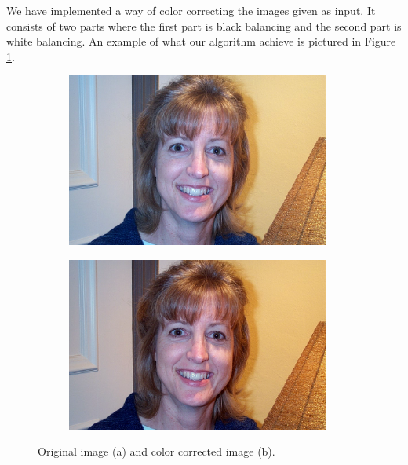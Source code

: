 We have implemented a way of color correcting the images given as input. It consists of two parts where the first part is black balancing and the second part is white balancing. An example of what our algorithm achieve is pictured in Figure \ref{fig:cc}.  

\begin{figure}[H]
\centering

\begin{subfigure}{.33\textwidth}
  \centering
  \includegraphics[width=0.95\textwidth]{img/cc/orig.jpg}
  \caption{}
\end{subfigure}%
\begin{subfigure}{.33\textwidth}
  \centering
  \includegraphics[width=0.95\textwidth]{img/cc/cc.png}
  \caption{}
\end{subfigure}%

\caption{Original image (a) and color corrected image (b).}


\label{fig:cc}
\end{figure}


